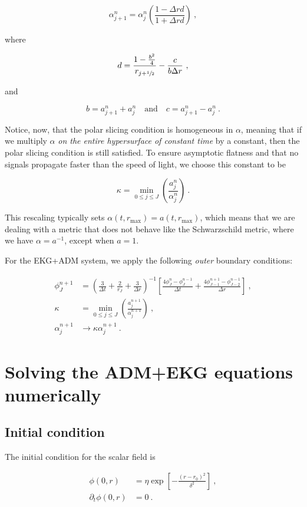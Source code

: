 \documentclass[a4paper,11pt]{article}
\renewcommand{\a}{\alpha}
\renewcommand{\d}{\delta}
\newcommand{\pd}{\partial}
\newcommand{\nn}{\nonumber}
\newcommand{\dt}{\Delta t}
\newcommand{\dr}{\Delta r}
\newcommand{\lrpar}[1]{\left( #1 \right)}
\newcommand{\lrsquare}[1]{\left[ #1 \right]}
\newcommand{\n}{\noindent}
\newcommand{\eq}[1]{
  \begin{equation}
    #1
  \end{equation}
}
\newcommand{\spl}[1]{
  \begin{split}
    #1
  \end{split}
}
\newcommand{\al}[1]{
  \begin{align}
    #1
  \end{align}
}
\renewcommand{\parbox}[2]{

  \vspace*{0.25in}
  
  \begin{tcolorbox}[title=Box #1,colback=blue!5!white,colframe=gray!75!black]
    #2
  \end{tcolorbox}

  \vspace*{0.25in}

}
\begin{document}
\eq{ \a^{n}_{j+1} = \a^{n}_{j}\lrpar{\frac{1-\dr d}{1+\dr d}} \ ,}

\n where

\eq{ d = \frac{1 - \frac{b^{2}}{4}}{r_{j+\sfrac{1}{2}}} - \frac{c}{b\dr}\ ,}

\n and

\eq{ b = a^{n}_{j+1} + a^{n}_{j}\quad \text{and}\quad c = a^{n}_{j+1} - a^{n}_{j}\ .}

Notice, now, that the polar slicing condition is homogeneous in $\a$, meaning that if we multiply $\a$ \emph{on the entire hypersurface of constant time} by a constant, then the polar slicing condition is still satisfied. To ensure asymptotic flatness and that no signals propagate faster than the speed of light, we choose this constant to be

\eq{ \kappa = \min_{0\leq j\leq J}\lrpar{\frac{a^{n}_{j}}{\a^{n}_{j}}}\ . }

\n This rescaling typically sets $\a(t,r_{\max}) = a(t,r_{\max})$, which means that we are dealing with a metric that does not behave like the Schwarzschild metric, where we have $\a = a^{-1}$, except when $a=1$.

\parbox{5: EKG+ADM -- Outer boundary conditions}{
  For the EKG+ADM system, we apply the following \emph{outer} boundary conditions:
  \al{
    \phi^{n+1}_{J} &= \lrpar{\frac{3}{\dt} + \frac{2}{r_{J}} + \frac{3}{\dr}}^{-1}\lrsquare{\frac{4\phi^{n}_{J} - \phi^{n-1}_{J}}{\dt} + \frac{4\phi^{n+1}_{J-1} - \phi^{n-1}_{J-2}}{\dr}}\ ,\nn\\
    \kappa &= \min_{0\leq j\leq J}\lrpar{\frac{a^{n+1}_{j}}{\a^{n+1}_{j}}}\ ,\nn\\
    \a^{n+1}_{j} &\to \kappa\a^{n+1}_{j}\ .\nn
  }
}

\section{Solving the ADM+EKG equations numerically}

\subsection{Initial condition}

The initial condition for the scalar field is

\eq{
  \spl{
    \phi(0,r) &= \eta\exp\lrsquare{-\frac{\lrpar{r-r_{0}}^{2}}{\d^{2}}}\ ,\\
    \pd_{t}\phi(0,r) &= 0\ .
  }
  \label{eq:initial_condition_1}
}
\end{document}
